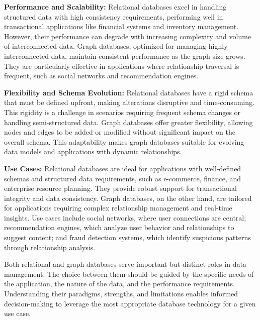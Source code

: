 \textbf{Performance and Scalability:} Relational databases excel in handling structured data with high consistency requirements, performing well in transactional applications like financial systems and inventory management. However, their performance can degrade with increasing complexity and volume of interconnected data. Graph databases, optimized for managing highly interconnected data, maintain consistent performance as the graph size grows. They are particularly effective in applications where relationship traversal is frequent, such as social networks and recommendation engines.

\textbf{Flexibility and Schema Evolution:} Relational databases have a rigid schema that must be defined upfront, making alterations disruptive and time-consuming. This rigidity is a challenge in scenarios requiring frequent schema changes or handling semi-structured data. Graph databases offer greater flexibility, allowing nodes and edges to be added or modified without significant impact on the overall schema. This adaptability makes graph databases suitable for evolving data models and applications with dynamic relationships.

\textbf{Use Cases:} Relational databases are ideal for applications with well-defined schemas and structured data requirements, such as e-commerce, finance, and enterprise resource planning. They provide robust support for transactional integrity and data consistency. Graph databases, on the other hand, are tailored for applications requiring complex relationship management and real-time insights. Use cases include social networks, where user connections are central; recommendation engines, which analyze user behavior and relationships to suggest content; and fraud detection systems, which identify suspicious patterns through relationship analysis.

Both relational and graph databases serve important but distinct roles in data management. The choice between them should be guided by the specific needs of the application, the nature of the data, and the performance requirements. Understanding their paradigms, strengths, and limitations enables informed decision-making to leverage the most appropriate database technology for a given use case.
